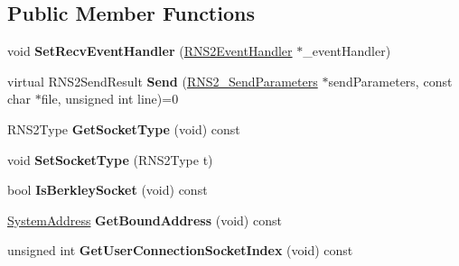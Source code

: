 \subsection*{Public Member Functions}
\begin{DoxyCompactItemize}
\item 
\hypertarget{class_rak_net_1_1_rak_net_socket2_a6e6af7fad9442252ebd9e6b3020877f3}{void {\bfseries Set\-Recv\-Event\-Handler} (\hyperlink{class_rak_net_1_1_r_n_s2_event_handler}{R\-N\-S2\-Event\-Handler} $\ast$\-\_\-event\-Handler)}\label{class_rak_net_1_1_rak_net_socket2_a6e6af7fad9442252ebd9e6b3020877f3}

\item 
\hypertarget{class_rak_net_1_1_rak_net_socket2_a1cdfce7f3e7e9780f60aa2fcd3addecf}{virtual R\-N\-S2\-Send\-Result {\bfseries Send} (\hyperlink{struct_rak_net_1_1_r_n_s2___send_parameters}{R\-N\-S2\-\_\-\-Send\-Parameters} $\ast$send\-Parameters, const char $\ast$file, unsigned int line)=0}\label{class_rak_net_1_1_rak_net_socket2_a1cdfce7f3e7e9780f60aa2fcd3addecf}

\item 
\hypertarget{class_rak_net_1_1_rak_net_socket2_a0bd44976024dcdaa61b079f9b32fa99a}{R\-N\-S2\-Type {\bfseries Get\-Socket\-Type} (void) const }\label{class_rak_net_1_1_rak_net_socket2_a0bd44976024dcdaa61b079f9b32fa99a}

\item 
\hypertarget{class_rak_net_1_1_rak_net_socket2_aba3e999b9424f145bdd1e08f7292e494}{void {\bfseries Set\-Socket\-Type} (R\-N\-S2\-Type t)}\label{class_rak_net_1_1_rak_net_socket2_aba3e999b9424f145bdd1e08f7292e494}

\item 
\hypertarget{class_rak_net_1_1_rak_net_socket2_a21c44ff21b1168cf92730b8e42a6fca8}{bool {\bfseries Is\-Berkley\-Socket} (void) const }\label{class_rak_net_1_1_rak_net_socket2_a21c44ff21b1168cf92730b8e42a6fca8}

\item 
\hypertarget{class_rak_net_1_1_rak_net_socket2_a4d1de26b8b34a9ceaccd65f43d9837fe}{\hyperlink{struct_rak_net_1_1_system_address}{System\-Address} {\bfseries Get\-Bound\-Address} (void) const }\label{class_rak_net_1_1_rak_net_socket2_a4d1de26b8b34a9ceaccd65f43d9837fe}

\item 
\hypertarget{class_rak_net_1_1_rak_net_socket2_ac33b513b535e8210939dfb3e4f4fa0d4}{unsigned int {\bfseries Get\-User\-Connection\-Socket\-Index} (void) const }\label{class_rak_net_1_1_rak_net_socket2_ac33b513b535e8210939dfb3e4f4fa0d4}


\end{DoxyCompactItemize}
